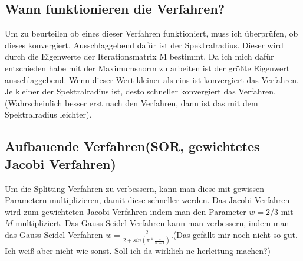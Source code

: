 \documentclass[a4paper, 11pt]{article}
\begin{document}
\subsection{Wann funktionieren die Verfahren?}
Um zu beurteilen ob eines dieser Verfahren funktioniert, muss ich \"uberpr\"ufen, ob dieses konvergiert. Ausschlaggebend daf\"ur ist der Spektralradius. Dieser wird durch die Eigenwerte der Iterationsmatrix M bestimmt.
Da ich mich daf\"ur entschieden habe mit der Maximumsnorm zu arbeiten ist der gr\"o\ss{}te Eigenwert ausschlaggebend. Wenn dieser Wert kleiner als eins ist konvergiert das Verfahren. 
Je kleiner der Spektralradius ist, desto schneller konvergiert das Verfahren. (Wahrscheinlich besser erst nach den Verfahren, dann ist das mit dem Spektralradius leichter).

\subsection{Aufbauende Verfahren(SOR, gewichtetes Jacobi Verfahren)}
Um die Splitting Verfahren zu verbessern, kann man diese mit gewissen Parametern multiplizieren, damit diese schneller werden. Das Jacobi Verfahren wird zum gewichteten Jacobi Verfahren indem man den Parameter \(w=2/3\) mit \(M\) multipliziert. 
Das Gauss Seidel Verfahren kann man verbessern, indem man das Gauss Seidel Verfahren \(w= \frac{2}{2+sin(\pi*\frac{1}{n+1})}\).(Das gef\"allt mir noch nicht so gut. Ich wei\ss{} aber nicht wie sonst. Soll ich da wirklich ne herleitung machen?)

\newpage
\end{document}
